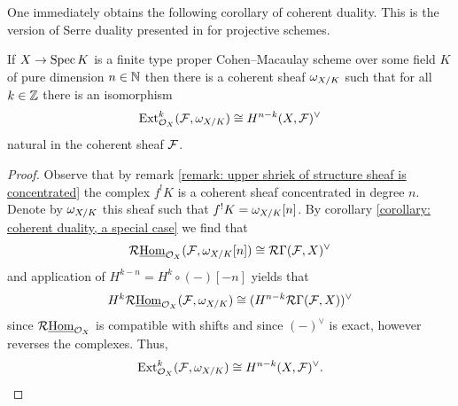 One immediately obtains the following corollary of coherent duality. This is the version of Serre duality presented in \cite[Chap. III, Thm. 7.6]{algebraic-geometry} for projective schemes.
\begin{corollary}
	\label{corollary: serre duality for cohen--macaulay schemes}
	
	If $X\to \operatorname{Spec} K$ is a finite type proper Cohen--Macaulay scheme over some field $K$ of pure dimension $n\in {\mathbb{N}}$ then there is a coherent sheaf $\omega_{X/K}$ such that for all $k\in {\mathbb{Z}}$ there is an isomorphism
		$${\operatorname{Ext}}_{{{\mathcal{O}}_{X}}}^k({\mathcal{F}}, \omega_{X/K}) \cong H^{n-k}(X, {\mathcal{F}})^\vee$$
natural in the coherent sheaf ${\mathcal{F}}$.
\end{corollary}
\begin{proof}
Observe that by remark \ref{remark: upper shriek of structure sheaf is concentrated} the complex $f^!K$ is a coherent sheaf concentrated in degree $n$. Denote by $\omega_{X/K}$ this sheaf such that $f^!K = \omega_{X/K}[n]$. By corollary \ref{corollary: coherent duality, a special case} we find that
$$\mathcal{R}{\underline{\operatorname{Hom}}}_{{\mathcal{O}}_{X}}({\mathcal{F}}, \omega_{X/K}[n]) \cong \mathcal{R}\Gamma({\mathcal{F}}, X)^\vee$$
and application of $H^{k-n}=H^k\circ (-)[-n]$ yields that
$$H^k\mathcal{R}{\underline{\operatorname{Hom}}}_{{\mathcal{O}}_{X}}({\mathcal{F}}, \omega_{X/K}) \cong (H^{n-k}\mathcal{R}\Gamma({\mathcal{F}}, X))^\vee$$
since $\mathcal{R}{\underline{\operatorname{Hom}}}_{{\mathcal{O}}_{X}}$ is compatible with shifts and since $(-)^\vee$ is exact, however reverses the complexes. Thus,
$${\operatorname{Ext}}^k_{{\mathcal{O}}_{X}}({\mathcal{F}}, \omega_{X/K})\cong H^{n-k}(X, {\mathcal{F}})^\vee.$$
\end{proof}

